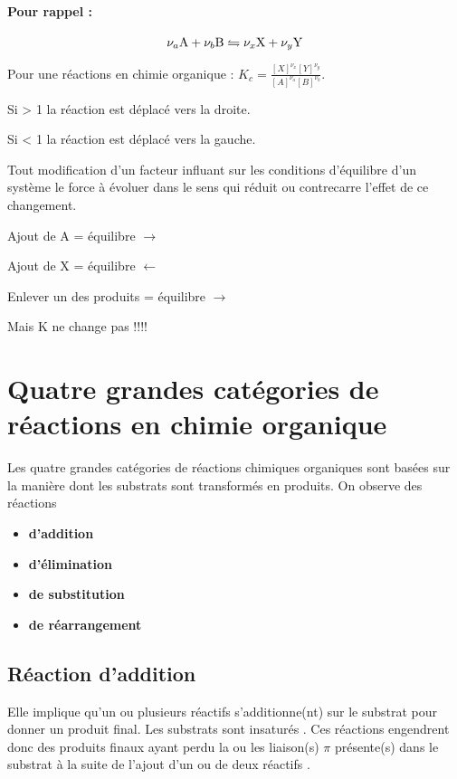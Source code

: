 \paragraph{Pour rappel :}
\[ \nu_{a} \ce{A} + \nu_{b} \ce{B}
\leftrightharpoons \nu_{x} \ce{X} + \nu_{y} \ce{Y} \]



Pour une réactions en chimie organique :
$K_c =\frac{[X]^{\nu_x}[Y]^{\nu_y}}{[A]^{\nu_a}[B]^{\nu_b}}$.

Si > 1 la réaction est déplacé vers la droite.

Si < 1 la réaction est déplacé vers la gauche.

Tout modification d'un facteur influant sur les conditions d'équilibre d'un système le force à évoluer dans le sens qui réduit ou contrecarre l'effet de  ce changement.

Ajout de A = équilibre $\longrightarrow$


Ajout de X = équilibre $\longleftarrow$


Enlever un des produits = équilibre  $\longrightarrow$

Mais K ne change pas !!!!


\section{Quatre grandes catégories de réactions en chimie organique}
Les quatre grandes catégories de réactions chimiques organiques sont basées sur la manière dont les substrats sont transformés en produits.
On observe des réactions

\begin{itemize}
  \item \textbf{d'addition}
  \item \textbf{d'élimination}
  \item \textbf{de substitution}
  \item \textbf{de réarrangement}
\end{itemize}

\subsection{Réaction d'addition}
Elle implique qu'un ou plusieurs réactifs s'additionne(nt) sur le substrat pour donner un produit final.
Les substrats sont insaturés .
Ces réactions engendrent donc des produits finaux ayant perdu la ou les liaison(s) $\pi $ présente(s) dans le substrat à la suite de l'ajout d'un ou de deux réactifs .

